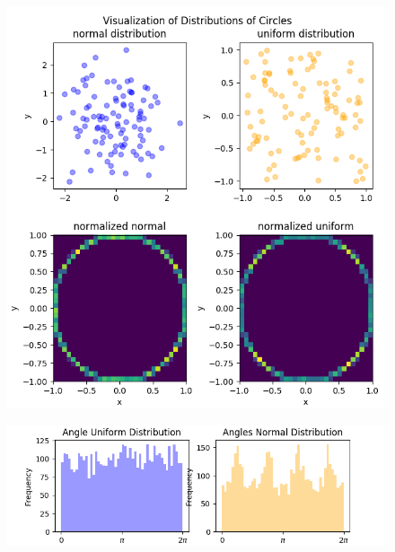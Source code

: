 \begin{figure}[htb!]
\begin{center}
\includegraphics[width=13.5cm]{styles/distributions} \label{plot:distributions}
  \caption{}
  \includegraphics[width=15.0cm]{styles/histograms} \label{plot:historam}
    \caption{}
\end{center}
\end{figure}
\cite{Yang,Muller1959,marsaglia1972}



